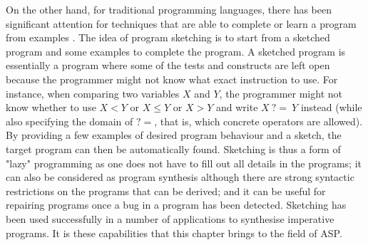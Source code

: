 On the other hand, for traditional programming languages, there has been significant attention for techniques that are able
to complete \parencite{sketching_phd_thesis} or learn a program from examples \parencite{gulwani2015inductive}. 
The idea of program sketching is to start from a sketched program and some examples
to complete the program. A sketched program is essentially a program where some of the tests and constructs
are left open because the programmer might not know what exact instruction to use.  For instance, 
when comparing two variables $X$ and $Y$, the programmer might not know whether to use $X < Y$ or $X \leq Y$ or $X > Y$ and write 
$X~{?}{=}~Y$ instead (while also specifying the domain of ${?}{=}$, that is, which concrete operators are allowed). 
By providing a few examples of desired program behaviour and a sketch, the target program can then be automatically found.
Sketching is thus a form of "lazy" programming as one does not have to fill out all details in the programs; 
it can also be considered as program synthesis although there are strong syntactic restrictions on 
the programs that can be derived; and it can be useful for repairing programs once a bug in a program has been detected.
Sketching has been used successfully in a number of applications \parencite{sketching_original,sketch_recent,jsketch} to synthesise imperative programs.
It is these capabilities that this chapter brings to the field of ASP.


